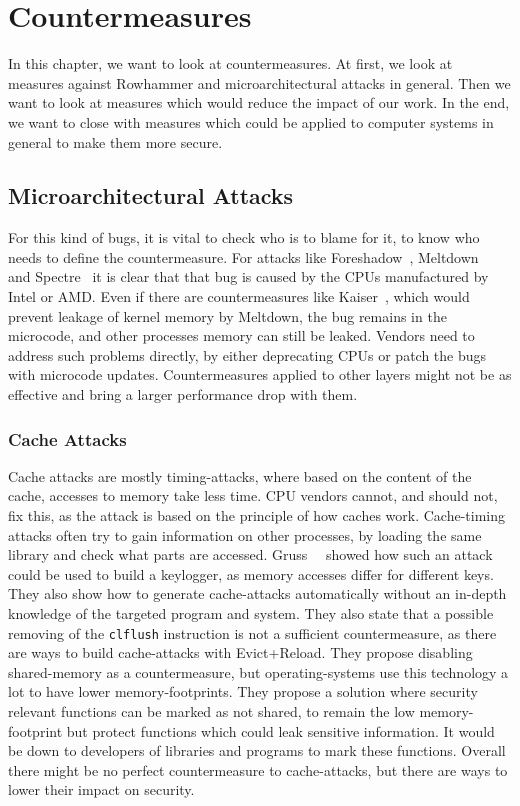 \chapter{Countermeasures}\label{sec:countermeasure}

In this chapter, we want to look at countermeasures. At first, we look at
measures against Rowhammer and microarchitectural attacks in general. Then we
want to look at measures which would reduce the impact of our work. In the end,
we want to close with measures which could be applied to computer systems in
general to make them more secure.

\section{Microarchitectural Attacks}

For this kind of bugs, it is vital to check who is to blame for it, to know who
needs to define the countermeasure. For attacks like
Foreshadow~\cite{foreshadow}, Meltdown~\cite{meltdown} and
Spectre~\cite{spectre} it is clear that that bug is caused by the CPUs
manufactured by Intel or AMD. Even if there are countermeasures like
Kaiser~\cite{kaiserpaper}, which would prevent leakage of kernel memory by
Meltdown, the bug remains in the microcode, and other processes\textquotesingle
memory can still be leaked. Vendors need to address such problems directly, by
either deprecating CPUs or patch the bugs with microcode updates.
Countermeasures applied to other layers might not be as effective and bring a
larger performance drop with them.

\subsection{Cache Attacks}

Cache attacks are mostly timing-attacks, where based on the content of the
cache, accesses to memory take less time. CPU vendors cannot, and should not,
fix this, as the attack is based on the principle of how caches work.
Cache-timing attacks often try to gain information on other processes, by
loading the same library and check what parts are accessed.
Gruss~\etal~\cite{gruss2015cache} showed how such an attack could be used to
build a keylogger, as memory accesses differ for different keys. They also show
how to generate cache-attacks automatically without an in-depth knowledge of
the targeted program and system. They also state that a possible removing of
the \texttt{clflush} instruction is not a sufficient countermeasure, as there
are ways to build cache-attacks with Evict+Reload. They propose disabling
shared-memory as a countermeasure, but operating-systems use this technology a
lot to have lower memory-footprints. They propose a solution where security
relevant functions can be marked as not shared, to remain the low
memory-footprint but protect functions which could leak sensitive information.
It would be down to developers of libraries and programs to mark these
functions. Overall there might be no perfect countermeasure to cache-attacks,
but there are ways to lower their impact on security.

